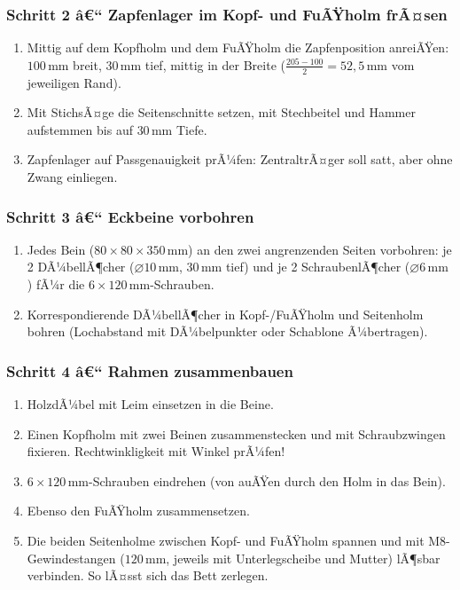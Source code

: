 ﻿\documentclass[12pt,a4paper]{article}
\theoremstyle{definition}
\theoremstyle{plain}
\theoremstyle{remark}
\begin{document}
\subsubsection*{Schritt 2 â€“ Zapfenlager im Kopf- und FuÃŸholm frÃ¤sen}

\begin{enumerate}
  \item Mittig auf dem Kopfholm und dem FuÃŸholm die Zapfenposition
        anreiÃŸen: $100\,\text{mm}$ breit, $30\,\text{mm}$ tief, mittig in der Breite
        ($\frac{205 - 100}{2} = 52{,}5\,\text{mm}$ vom jeweiligen Rand).
  \item Mit StichsÃ¤ge die Seitenschnitte setzen, mit Stechbeitel und
        Hammer aufstemmen bis auf $30\,\text{mm}$ Tiefe.
  \item Zapfenlager auf Passgenauigkeit prÃ¼fen: ZentraltrÃ¤ger soll satt,
        aber ohne Zwang einliegen.
\end{enumerate}

\subsubsection*{Schritt 3 â€“ Eckbeine vorbohren}

\begin{enumerate}
  \item Jedes Bein ($80 \times 80 \times 350\,\text{mm}$) an den zwei angrenzenden
        Seiten vorbohren: je 2 DÃ¼bellÃ¶cher ($\varnothing 10\,\text{mm}$, $30\,\text{mm}$
        tief) und je 2 SchraubenlÃ¶cher ($\varnothing 6\,\text{mm}$) fÃ¼r die
        $6 \times 120\,\text{mm}$-Schrauben.
  \item Korrespondierende DÃ¼bellÃ¶cher in Kopf-/FuÃŸholm und Seitenholm
        bohren (Lochabstand mit DÃ¼belpunkter oder Schablone Ã¼bertragen).
\end{enumerate}

\subsubsection*{Schritt 4 â€“ Rahmen zusammenbauen}

\begin{enumerate}
  \item HolzdÃ¼bel mit Leim einsetzen in die Beine.
  \item Einen Kopfholm mit zwei Beinen zusammenstecken und mit
        Schraubzwingen fixieren. Rechtwinkligkeit mit Winkel prÃ¼fen!
  \item $6 \times 120\,\text{mm}$-Schrauben eindrehen (von auÃŸen durch den Holm
        in das Bein).
  \item Ebenso den FuÃŸholm zusammensetzen.
  \item Die beiden Seitenholme zwischen Kopf- und FuÃŸholm spannen
        und mit M8-Gewindestangen ($120\,\text{mm}$, jeweils mit Unterlegscheibe
        und Mutter) lÃ¶sbar verbinden. So lÃ¤sst sich das Bett zerlegen.
\end{enumerate}
\end{document}

